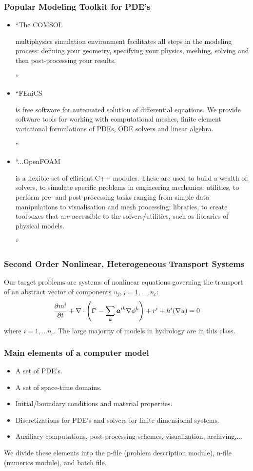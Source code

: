 \documentclass{beamer}
\begin{document}
\begin{frame}
\frametitle{Popular Modeling Toolkit for PDE's}

\begin{itemize}
\item ``The COMSOL \begin{footnotesize}multiphysics simulation
  environment facilitates all steps in the modeling process: defining
  your geometry, specifying your physics, meshing, solving and then
  post-processing your results.\end{footnotesize}''

\item ``FEniCS \begin{footnotesize}is free software for automated
  solution of differential equations. We provide software tools for
  working with computational meshes, finite element variational
  formulations of PDEs, ODE solvers and linear
  algebra.\end{footnotesize}''

\item ``...OpenFOAM \begin{footnotesize}is a flexible set of efficient
  C++ modules. These are used to build a wealth of: solvers, to
  simulate specific problems in engineering mechanics; utilities, to
  perform pre- and post-processing tasks ranging from simple data
  manipulations to visualisation and mesh processing; libraries, to
  create toolboxes that are accessible to the solvers/utilities, such
  as libraries of physical models.\end{footnotesize}''
\end{itemize}
\end{frame}

\begin{frame}
\frametitle{Second Order Nonlinear, Heterogeneous Transport Systems}
Our target problems are systems of nonlinear equations governing the
transport of an abstract vector of components $u_j,j=1,\ldots,n_c$:
\begin{equation*}
\frac{\partial {m^i}}{\partial {t}} + \nabla \cdot \left( {\bf f}^i - \sum_k \mbox{{\boldmath ${a}$}}^{ik} \nabla \phi^k
\right) + r^i + h^i(\nabla u) = 0
\end{equation*}
where $i=1,\ldots n_c$. The large majority of models in hydrology are
in this class.
\end{frame}

\begin{frame}
\frametitle{Main elements of a computer model}
\begin{itemize}
\item A set of PDE's.
\item A set of space-time domains.
\item Initial/boundary conditions and material properties.
\item Discretizations for PDE's and solvers for finite dimensional
  systems.
\item Auxiliary computations, post-processing schemes, visualization,
  archiving,...
\end{itemize}
We divide these elements into the \alert{p-file} (problem description
module), \alert{n-file} (numerics module), and \alert{batch} file.
\end{frame}
\end{document}
